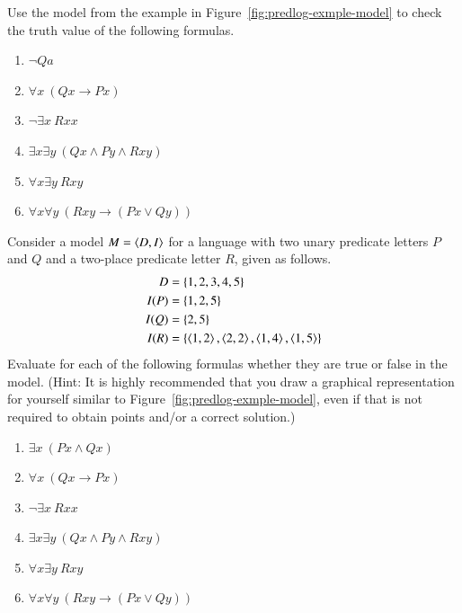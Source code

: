 \documentclass[nobib,nofonts]{tufte-handout}
\begin{document}
\bigskip
\noindent \colorbox{mygray}{\centering
  \begin{minipage}{1.0\textwidth}

    \begin{exercise}
      Use the model from the example in Figure~\ref{fig:predlog-exmple-model} to check the truth value of the following formulas.
      \begin{multicols}{2}
        \begin{enumerate}
          \item $\neg Qa$
          \item $\forall x \ (Qx \rightarrow Px)$
          \item $\neg \exists x \ Rxx$
          \item $\exists x \exists y \ (Qx \wedge Py \wedge Rxy)$
          \item $\forall x \exists  y \ Rxy$
          \item $\forall x \forall y \ (Rxy \rightarrow (Px \vee Qy))$
        \end{enumerate}
      \end{multicols}
    \end{exercise}

    \begin{exercise}
      Consider a model $M = \left \langle D,I\right\rangle$ for a language with two unary predicate letters $P$ and $Q$ and a two-place predicate letter $R$, given as follows.
      \begin{align*}
        D    & = \left\{1,2,3,4,5\right\}\\
        I(P) & = \left\{1,2,5\right\} \\
        I(Q) & = \left\{2,5\right\} \\
        I(R) & = \left\{\left \langle 1,2\right\rangle,\left \langle 2,2\right\rangle, \left \langle 1,4\right\rangle, \left \langle 1,5\right\rangle\right\}
      \end{align*}
      Evaluate for each of the following formulas whether they are true or false in the model.
      (Hint: It is highly recommended that you draw a graphical representation for yourself similar to Figure~\ref{fig:predlog-exmple-model}, even if that is not required to obtain points and/or a correct solution.)
      \begin{multicols}{2}
        \begin{enumerate}
          \item $\exists x \ (Px \wedge Qx)$
          \item $\forall x \ (Qx \rightarrow Px)$
          \item $\neg \exists x \ Rxx$
          \item $\exists x \exists y \ (Qx \wedge Py \wedge Rxy)$
          \item $\forall x \exists  y \ Rxy$
          \item $\forall x \forall y \ (Rxy \rightarrow (Px \vee Qy))$
        \end{enumerate}
    \end{multicols}
    \end{exercise}


\end{minipage}}
\end{document}
